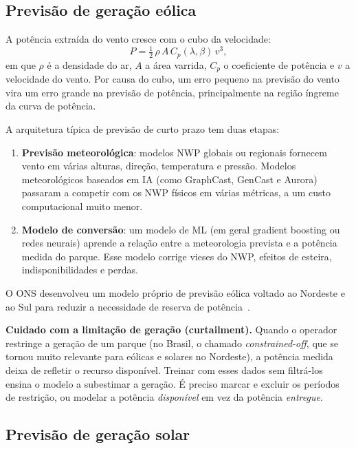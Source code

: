 \documentclass[10pt,a4paper,oneside]{article}
\begin{document}
\subsection{Previsão de geração eólica}

A potência extraída do vento cresce com o cubo da velocidade:
\begin{equation}
  P = \tfrac{1}{2}\,\rho\, A\, C_p(\lambda, \beta)\, v^3,
\end{equation}
em que $\rho$ é a densidade do ar, $A$ a área varrida, $C_p$ o coeficiente de
potência e $v$ a velocidade do vento. Por causa do cubo, um erro pequeno na
previsão do vento vira um erro grande na previsão de potência, principalmente
na região íngreme da curva de potência.

A arquitetura típica de previsão de curto prazo tem duas etapas:
\begin{enumerate}
  \item \textbf{Previsão meteorológica}: modelos NWP globais ou regionais
    fornecem vento em várias alturas, direção, temperatura e pressão.
    Modelos meteorológicos baseados em IA (como GraphCast, GenCast e Aurora)
    passaram a competir com os NWP físicos em várias métricas, a um custo
    computacional muito menor.
  \item \textbf{Modelo de conversão}: um modelo de ML (em geral gradient
    boosting ou redes neurais) aprende a relação entre a meteorologia
    prevista e a potência medida do parque. Esse modelo corrige vieses do
    NWP, efeitos de esteira, indisponibilidades e perdas.
\end{enumerate}

O ONS desenvolveu um modelo próprio de previsão eólica voltado ao Nordeste e
ao Sul para reduzir a necessidade de reserva de potência~\cite{onseolico}.

\begin{nota}
\textbf{Cuidado com a limitação de geração (curtailment).} Quando o operador
restringe a geração de um parque (no Brasil, o chamado
\textit{constrained-off}, que se tornou muito relevante para eólicas e solares
no Nordeste), a potência medida deixa de refletir o recurso disponível. Treinar
com esses dados sem filtrá-los ensina o modelo a subestimar a geração. É
preciso marcar e excluir os períodos de restrição, ou modelar a potência
\emph{disponível} em vez da potência \emph{entregue}.
\end{nota}

\subsection{Previsão de geração solar}
\end{document}
